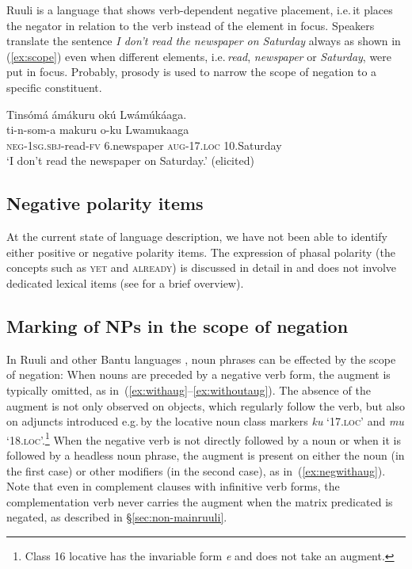 \documentclass[output=paper,colorlinks,citecolor=brown,draftmode]{langscibook}
\begin{document}
Ruuli is a language that shows verb-dependent negative placement, i.e.\,it places the negator in relation to the verb instead of the element in focus. 
Speakers translate the sentence \textit{I don't read the newspaper on Saturday} always as shown in (\ref{ex:scope}) even when different elements, i.e.\,\textit{read}, \textit{newspaper} or \textit{Saturday}, were put in focus. 
Probably, prosody is used to narrow the scope of negation to a specific constituent.

\ea \label{ex:scope}
	\glll  Tinsómá ámákuru okú Lwámúkáaga.\\
	        ti-n-som-a makuru o-ku Lwamukaaga\\
	    	\textsc{neg}-1\textsc{sg.sbj}-read-\textsc{fv} 6.newspaper \textsc{aug}-17.\textsc{loc} 10.Saturday\\
    \glt ‘I don't read the newspaper on Saturday.’  (elicited)
\z


\subsection{Negative polarity items}\label{sec:polarityruuli}

At the current state of language description, we have not been able to identify either positive or negative polarity items. 
The expression of phasal polarity (the concepts such as \textsc{yet} and \textsc{already}) 
is discussed in detail in \citet{MolochievaEtAl2021} and does not involve dedicated lexical items (see  for a brief overview).

\subsection{Marking of NPs in the scope of negation} \label{sec:markingscoperuuli}
In Ruuli and other Bantu languages \citep[80]{Miestamo2014}, noun phrases can be effected by the scope of negation: 
When nouns are preceded by a negative verb form, the augment is typically omitted, as in~(\ref{ex:withaug}--\ref{ex:withoutaug}). 
The absence of the augment is not only observed on objects, which regularly follow the verb, but also on adjuncts introduced e.g.\,by the locative noun class markers \textit{ku} `17.\textsc{loc}' and \textit{mu} `18.\textsc{loc}'.\footnote{Class 16 locative has the invariable form \textit{e} and does not take an augment.}
When the negative verb is not directly followed  by a noun or when it is followed by a headless noun phrase, the augment is present on either the noun (in the first case) or other modifiers (in the second case), as in~(\ref{ex:negwithaug}). 
Note that even in complement clauses with infinitive verb forms, the complementation verb never carries the augment when the matrix predicated is negated, as described in §\ref{sec:non-mainruuli}.  
\end{document}

